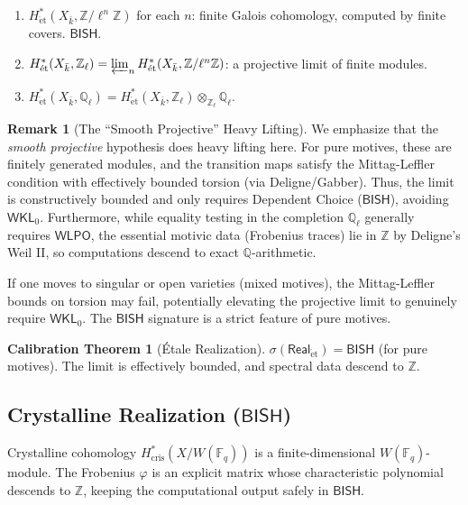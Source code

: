 \documentclass[11pt,a4paper]{article}
\theoremstyle{plain}
\theoremstyle{definition}
\newtheorem{remark}[theorem]{Remark}
\newtheorem{calibration}[theorem]{Calibration Theorem}
\newcommand{\BISH}{\textsf{BISH}}
\newcommand{\WKL}{\textsf{WKL}_0}
\newcommand{\WLPO}{\textsf{WLPO}}
\newcommand{\Real}{\mathsf{Real}}
\newcommand{\sig}{\sigma}
\newcommand{\Z}{\mathbb{Z}}
\newcommand{\Q}{\mathbb{Q}}
\newcommand{\F}{\mathbb{F}}
\begin{document}
\begin{enumerate}[label=(\alph*)]
\item $H^*_{\mathrm{\acute{e}t}}(X_{\bar{k}}, \Z/\ell^n\Z)$ for each $n$: finite Galois cohomology, computed by finite covers. $\BISH$.
\item $H^*_{\mathrm{\acute{e}t}}(X_{\bar{k}}, \Z_\ell) = \varprojlim_n H^*_{\mathrm{\acute{e}t}}(X_{\bar{k}}, \Z/\ell^n\Z)$: a projective limit of finite modules. 
\item $H^*_{\mathrm{\acute{e}t}}(X_{\bar{k}}, \Q_\ell) = H^*_{\mathrm{\acute{e}t}}(X_{\bar{k}}, \Z_\ell) \otimes_{\Z_\ell} \Q_\ell$. 
\end{enumerate}

\begin{remark}[The ``Smooth Projective'' Heavy Lifting]\label{rmk:smooth-projective}
We emphasize that the \emph{smooth projective} hypothesis does heavy lifting here. For pure motives, these are finitely generated modules, and the transition maps satisfy the Mittag-Leffler condition with effectively bounded torsion (via Deligne/Gabber). Thus, the limit is constructively bounded and only requires Dependent Choice ($\BISH$), avoiding $\WKL$. Furthermore, while equality testing in the completion $\Q_\ell$ generally requires $\WLPO$, the essential motivic data (Frobenius traces) lie in $\Z$ by Deligne's Weil II, so computations descend to exact $\Q$-arithmetic.

If one moves to singular or open varieties (mixed motives), the Mittag-Leffler bounds on torsion may fail, potentially elevating the projective limit to genuinely require $\WKL$. The $\BISH$ signature is a strict feature of pure motives.
\end{remark}

\begin{calibration}[\'Etale Realization]\label{cal:etale}
$\sig(\Real_{\mathrm{\acute{e}t}}) = \BISH$ (for pure motives). The limit is effectively bounded, and spectral data descend to $\Z$.
\end{calibration}

\subsection{Crystalline Realization ($\BISH$)}

Crystalline cohomology $H^*_{\mathrm{cris}}(X/W(\F_q))$ is a finite-dimensional $W(\F_q)$-module. The Frobenius $\varphi$ is an explicit matrix whose characteristic polynomial descends to $\Z$, keeping the computational output safely in $\BISH$.
\end{document}
